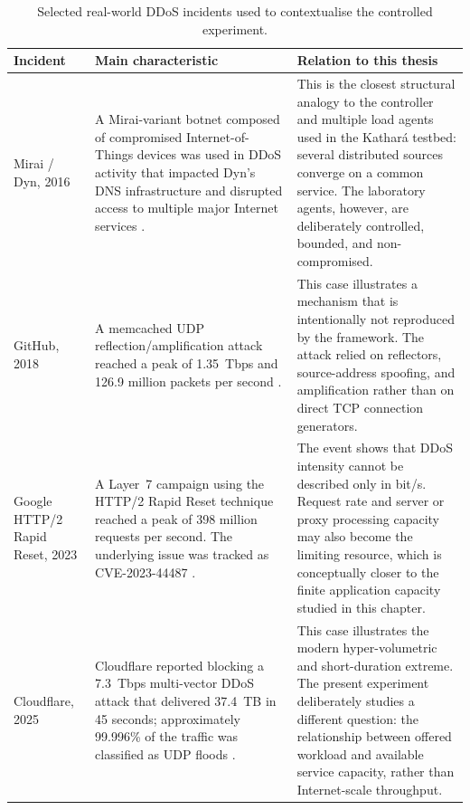 \begin{table}[htbp]
\centering
\small
\begin{tabular}{p{}p{}p{}}
\toprule
\textbf{Incident} & \textbf{Main characteristic} & \textbf{Relation to this thesis} \\
\midrule
Mirai / Dyn, 2016 &
A Mirai-variant botnet composed of compromised Internet-of-Things devices was
used in DDoS activity that impacted Dyn's DNS infrastructure and disrupted
access to multiple major Internet services \cite{doj_mirai_dyn_2020}. &
This is the closest structural analogy to the controller and multiple load
agents used in the Kathar\'a testbed: several distributed sources converge on
a common service. The laboratory agents, however, are deliberately controlled,
bounded, and non-compromised. \\

GitHub, 2018 &
A memcached UDP reflection/amplification attack reached a peak of
1.35~Tbps and 126.9 million packets per second
\cite{github_ddos_2018}. &
This case illustrates a mechanism that is intentionally not reproduced by the
framework. The attack relied on reflectors, source-address spoofing, and
amplification rather than on direct TCP connection generators. \\

Google HTTP/2 Rapid Reset, 2023 &
A Layer~7 campaign using the HTTP/2 Rapid Reset technique reached a peak of
398 million requests per second. The underlying issue was tracked as
CVE-2023-44487 \cite{google_rapid_reset_2023}. &
The event shows that DDoS intensity cannot be described only in bit/s. Request
rate and server or proxy processing capacity may also become the limiting
resource, which is conceptually closer to the finite application capacity
studied in this chapter. \\

Cloudflare, 2025 &
Cloudflare reported blocking a 7.3~Tbps multi-vector DDoS attack that delivered
37.4~TB in 45 seconds; approximately 99.996\% of the traffic was classified as
UDP floods \cite{cloudflare_ddos_2025}. &
This case illustrates the modern hyper-volumetric and short-duration extreme.
The present experiment deliberately studies a different question: the
relationship between offered workload and available service capacity, rather
than Internet-scale throughput. \\
\bottomrule
\end{tabular}
\caption{Selected real-world DDoS incidents used to contextualise the controlled experiment.}
\label{tab:real-world-ddos-cases}
\end{table}

